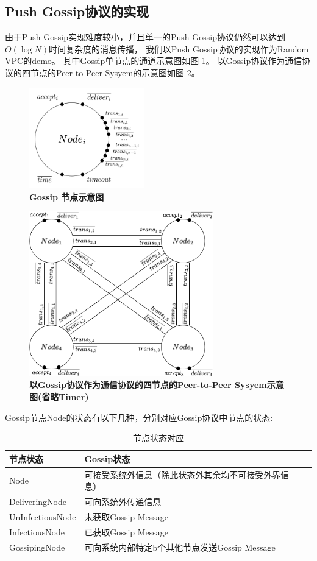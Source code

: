 \subsection{Push Gossip协议的实现}
由于Push Gossip实现难度较小，并且单一的Push Gossip协议仍然可以达到$O(\log N)$时间复杂度的消息传播，
我们以Push Gossip协议的实现作为Random VPC的demo。
其中Gossip单节点的通道示意图如图
\ref{fig1}。
以Gossip协议作为通信协议的四节点的Peer-to-Peer Sysyem的示意图如图
\ref{fig2}。

\begin{figure}[!htbp]
	\small
	\centering
	\includegraphics[width=5cm]{../figure/Node_gossip.png}
    \caption{\textbf{Gossip 节点示意图}}
    \label{fig1}
\end{figure}

\begin{figure}[!htbp]
	\small
	\centering
	\includegraphics[width=8cm]{../figure/GossipSystem_4.png}
    \caption{\textbf{以Gossip协议作为通信协议的四节点的Peer-to-Peer Sysyem示意图(省略Timer)}}
    \label{fig2}
\end{figure}

Gossip节点Node的状态有以下几种，分别对应Gossip协议中节点的状态:
\begin{table}[!hpt]
    \caption[节点状态对应]{节点状态对应\footnotemark}
    \label{tab:firstone}
    \centering
    \begin{tabular}{@{}llr@{}} \toprule
      节点状态 & Gossip状态 \\ \midrule
      Node&可接受系统外信息（除此状态外其余均不可接受外界信息）\\
      DeliveringNode&可向系统外传递信息\\
      UnInfectiousNode&未获取Gossip Message\\
      InfectiousNode&已获取Gossip Message\\
      GossipingNode&可向系统内部特定b个其他节点发送Gossip Message\\ \bottomrule
    \end{tabular}
  \end{table}

